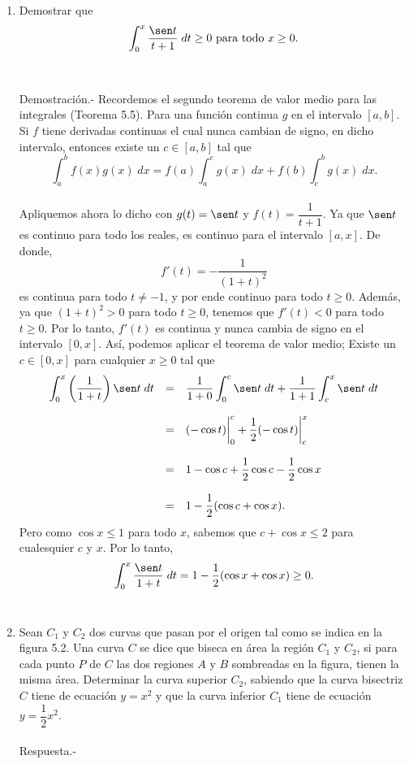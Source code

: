 \begin{enumerate}[\bfseries 1.]
    \item Demostrar que
    $$\int_0^x \dfrac{\sen t}{t+1}\; dt \geq 0\mbox{ para todo }x\geq 0.$$\\\\
	Demostración.-\; Recordemos el segundo teorema de valor medio para las integrales (Teorema 5.5). Para una función continua $g$ en el intervalo $[a,b]$. Si $f$ tiene derivadas continuas el cual nunca cambian de signo, en dicho intervalo, entonces existe un $c\in[a,b]$ tal que
	$$\int_a^b f(x)g(x)\;dx =f(a)\int_a^c g(x)\; dx + f(b)\int_c^b g(x)\; dx.$$\\
	Apliquemos ahora lo dicho con $g(t)=\sen t$ y $f(t)=\dfrac{1}{t+1}$. Ya que $\sen t$ es continuo para todo los reales, es continuo para el intervalo $[a,x]$. De donde,
	$$f'(t)=-\dfrac{1}{(1+t)^2}$$
	es continua para todo $t\neq -1$, y por ende continuo para todo $t\geq 0$. Además, ya que $(1+t)^2>0$ para todo $t\geq 0$, tenemos que $f'(t)<0$ para todo $t\geq 0$. Por lo tanto, $f'(t)$ es continua y nunca cambia de signo en el intervalo $[0,x]$. Así, podemos aplicar el teorema de valor medio; Existe un $c\in[0,x]$ para cualquier $x\geq 0$ tal que
	$$
	\begin{array}{rcl}
	    \displaystyle\int_0^x \left(\dfrac{1}{1+t}\right)\sen t\; dt &=& \dfrac{1}{1+0}\displaystyle\int_0^c \sen t\; dt + \dfrac{1}{1+1}\int_c^x \sen t\; dt\\\\
									 &=& (-\cos t)\bigg|_0^c+\dfrac{1}{2}(-\cos t)\bigg|_c^x\\\\
									 &=& 1-\cos c+\dfrac{1}{2}\cos c-\dfrac{1}{2}\cos x\\\\
									 &=&1-\dfrac{1}{2}(\cos c+\cos x).
	\end{array}
	$$
	Pero como $\cos x\leq 1$ para todo $x$, sabemos que $c+\cos x\leq 2$ para cualesquier $c$ y $x$. Por lo tanto,
	$$\int_0^x \dfrac{\sen t}{1+t}\; dt = 1-\dfrac{1}{2}(\cos x+\cos x)\geq 0.$$\\


    \item Sean $C_1$ y $C_2$ dos curvas que pasan por el origen tal como se indica en la figura 5.2. Una curva $C$ se dice que biseca en área la región $C_1$ y $C_2$, si para cada punto $P$ de $C$ las dos regiones $A$ y $B$ sombreadas en la figura, tienen la misma área. Determinar la curva superior $C_2$, sabiendo que la curva bisectriz $C$ tiene de ecuación $y=x^2$ y que la curva inferior $C_1$ tiene de ecuación $y=\dfrac{1}{2}x^2.$\\\\
	Respuesta.-\;


\end{enumerate}
